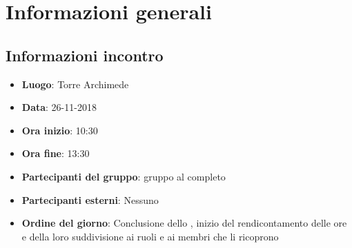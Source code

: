 \newcommand{\documento}{\VI}
\newcommand{\nomedocumentofisico}{VI\_26\_11\_2018.pdf}
\newcommand{\redazione}{\CV \\ & \SG}
\newcommand{\verifica}{\NC}
\newcommand{\approvazione}{\LC}
\newcommand{\versione}{1.0.0}
\newcommand{\uso}{Interno}
\newcommand{\destinateTo}{\TV, \\ & \RC, \\ & \gruppo}
\newcommand{\datacreazione}{30 novembre 2018}
\newcommand{\datamodifica}{2 dicembre 2018}
\newcommand{\stato}{Approvato}

\def\TABELLE{false}	%
\def\FIGURE{false} 	%






    

    
    
	
    
    \section{Informazioni generali}
		\subsection{Informazioni incontro}
			\begin{itemize}
				\item { \textbf{Luogo}:  Torre Archimede}
				\item { \textbf{Data}: 26-11-2018}
				\item { \textbf{Ora inizio}: 10:30}
				\item { \textbf{Ora fine}: 13:30}
				\item { \textbf{Partecipanti del gruppo}: gruppo al completo}
				\item { \textbf{Partecipanti esterni}: Nessuno}
				\item { \textbf{Ordine del giorno}: Conclusione dello \Doc{\SdFv}, inizio del rendicontamento delle ore e della loro suddivisione ai ruoli e ai membri che li ricoprono}
			\end{itemize}


